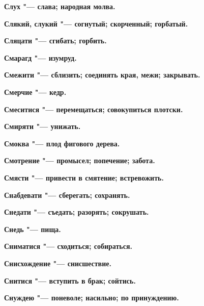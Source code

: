 \begin{multicols}{2}
\bfseries Слух\normalfont{} "--- слава; народная молва. 




\bfseries Слякий, слукий\normalfont{} "--- согнутый; скорченный; горбатый. 




\bfseries Сляцати\normalfont{} "--- сгибать; горбить. 




\bfseries Смарагд\normalfont{} "--- изумруд. 




\bfseries Смежити\normalfont{} "--- сблизить; соединять края, межи; закрывать. 




\bfseries Смерчие\normalfont{} "--- кедр. 




\bfseries Смеситися\normalfont{} "--- перемещаться; совокупиться плотски. 




\bfseries Смиряти\normalfont{} "--- унижать. 




\bfseries Смоква\normalfont{} "--- плод фигового дерева. 




\bfseries Смотрение\normalfont{} "--- промысел; попечение; забота. 




\bfseries Смясти\normalfont{} "--- привести в смятение; встревожить. 




\bfseries Снабдевати\normalfont{} "--- сберегать; сохранять. 




\bfseries Снедати\normalfont{} "--- съедать; разорять; сокрушать. 




\bfseries Снедь\normalfont{} "--- пища. 




\bfseries Сниматися\normalfont{} "--- сходиться; собираться. 




\bfseries Снисхождение\normalfont{} "--- снисшествие. 




\bfseries Снитися\normalfont{} "--- вступить в брак; сойтись. 




\bfseries Снуждею\normalfont{} "--- поневоле; насильно; по принуждению. 





\end{multicols}
